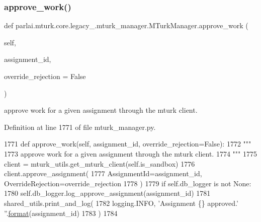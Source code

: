 \subsubsection{\texorpdfstring{approve\+\_\+work()}{approve\_work()}}
{\footnotesize\ttfamily def parlai.\+mturk.\+core.\+legacy\+\_.\+mturk\+\_\+manager.\+M\+Turk\+Manager.\+approve\+\_\+work (\begin{DoxyParamCaption}\item[{}]{self,  }\item[{}]{assignment\+\_\+id,  }\item[{}]{override\+\_\+rejection = {\ttfamily False} }\end{DoxyParamCaption})}

\begin{DoxyVerb}approve work for a given assignment through the mturk client.
\end{DoxyVerb}
 

Definition at line 1771 of file mturk\+\_\+manager.\+py.


\begin{DoxyCode}
1771     \textcolor{keyword}{def }approve\_work(self, assignment\_id, override\_rejection=False):
1772         \textcolor{stringliteral}{"""}
1773 \textcolor{stringliteral}{        approve work for a given assignment through the mturk client.}
1774 \textcolor{stringliteral}{        """}
1775         client = mturk\_utils.get\_mturk\_client(self.is\_sandbox)
1776         client.approve\_assignment(
1777             AssignmentId=assignment\_id, OverrideRejection=override\_rejection
1778         )
1779         \textcolor{keywordflow}{if} self.db\_logger \textcolor{keywordflow}{is} \textcolor{keywordflow}{not} \textcolor{keywordtype}{None}:
1780             self.db\_logger.log\_approve\_assignment(assignment\_id)
1781         shared\_utils.print\_and\_log(
1782             logging.INFO, \textcolor{stringliteral}{'Assignment \{\} approved.'} \textcolor{stringliteral}{''}.\hyperlink{namespaceparlai_1_1chat__service_1_1services_1_1messenger_1_1shared__utils_a32e2e2022b824fbaf80c747160b52a76}{format}(assignment\_id)
1783         )
1784 
\end{DoxyCode}
\mbox{\label{classparlai_1_1mturk_1_1core_1_1legacy__2018_1_1mturk__manager_1_1MTurkManager_a9f0d7c8eead5fc1a64b097880aba47a0}} 
